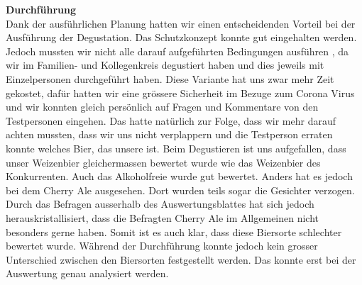 \textbf{Durchführung}\\
Dank der ausführlichen Planung hatten wir einen entscheidenden Vorteil bei der Ausführung der Degustation.
 Das Schutzkonzept konnte gut eingehalten werden. Jedoch mussten wir nicht alle darauf aufgeführten Bedingungen ausführen
 , da wir im Familien- und Kollegenkreis degustiert haben und dies jeweils mit Einzelpersonen durchgeführt haben. Diese Variante
hat uns zwar mehr Zeit gekostet, dafür hatten wir eine grössere Sicherheit im Bezuge zum Corona Virus und wir konnten gleich persönlich 
auf Fragen und Kommentare von den Testpersonen eingehen. Das hatte natürlich zur Folge, dass wir mehr darauf achten mussten, dass wir uns nicht
verplappern und die Testperson erraten konnte welches Bier, das unsere ist. Beim Degustieren ist uns aufgefallen, dass unser Weizenbier gleichermassen
bewertet wurde wie das Weizenbier des Konkurrenten. Auch das Alkoholfreie wurde gut bewertet. Anders hat es jedoch bei dem Cherry Ale
ausgesehen. Dort wurden teils sogar die Gesichter verzogen. Durch das Befragen ausserhalb des Auswertungsblattes hat sich jedoch
herauskristallisiert, dass die Befragten Cherry Ale im Allgemeinen nicht besonders gerne haben. Somit ist es auch klar, 
dass diese Biersorte schlechter bewertet wurde. Während der Durchführung konnte jedoch kein grosser Unterschied zwischen den Biersorten
festgestellt werden. Das konnte erst bei der Auswertung genau analysiert werden.
